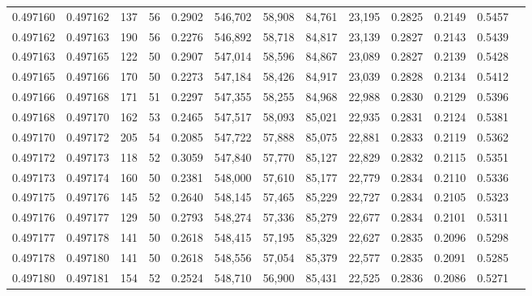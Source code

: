 \begin{tabular}{rrrrrrrrrrrrr}
0.497160 & 0.497162 &   137 &  56 &                                     0.2902 & 546,702 &  58,908 &  84,761 &  23,195 & 0.2825 & 0.2149 & 0.5457 \\
0.497162 & 0.497163 &   190 &  56 &                                     0.2276 & 546,892 &  58,718 &  84,817 &  23,139 & 0.2827 & 0.2143 & 0.5439 \\
0.497163 & 0.497165 &   122 &  50 &                                     0.2907 & 547,014 &  58,596 &  84,867 &  23,089 & 0.2827 & 0.2139 & 0.5428 \\
0.497165 & 0.497166 &   170 &  50 &                                     0.2273 & 547,184 &  58,426 &  84,917 &  23,039 & 0.2828 & 0.2134 & 0.5412 \\
0.497166 & 0.497168 &   171 &  51 &                                     0.2297 & 547,355 &  58,255 &  84,968 &  22,988 & 0.2830 & 0.2129 & 0.5396 \\
0.497168 & 0.497170 &   162 &  53 &                                     0.2465 & 547,517 &  58,093 &  85,021 &  22,935 & 0.2831 & 0.2124 & 0.5381 \\
0.497170 & 0.497172 &   205 &  54 &                                     0.2085 & 547,722 &  57,888 &  85,075 &  22,881 & 0.2833 & 0.2119 & 0.5362 \\
0.497172 & 0.497173 &   118 &  52 &                                     0.3059 & 547,840 &  57,770 &  85,127 &  22,829 & 0.2832 & 0.2115 & 0.5351 \\
0.497173 & 0.497174 &   160 &  50 &                                     0.2381 & 548,000 &  57,610 &  85,177 &  22,779 & 0.2834 & 0.2110 & 0.5336 \\
0.497175 & 0.497176 &   145 &  52 &                                     0.2640 & 548,145 &  57,465 &  85,229 &  22,727 & 0.2834 & 0.2105 & 0.5323 \\
0.497176 & 0.497177 &   129 &  50 &                                     0.2793 & 548,274 &  57,336 &  85,279 &  22,677 & 0.2834 & 0.2101 & 0.5311 \\
0.497177 & 0.497178 &   141 &  50 &                                     0.2618 & 548,415 &  57,195 &  85,329 &  22,627 & 0.2835 & 0.2096 & 0.5298 \\
0.497178 & 0.497180 &   141 &  50 &                                     0.2618 & 548,556 &  57,054 &  85,379 &  22,577 & 0.2835 & 0.2091 & 0.5285 \\
0.497180 & 0.497181 &   154 &  52 &                                     0.2524 & 548,710 &  56,900 &  85,431 &  22,525 & 0.2836 & 0.2086 & 0.5271 \\

\end{tabular}
